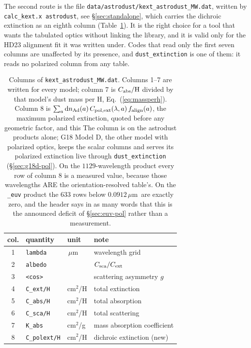 \documentclass{my_memo}
\newcommand{\code}[1]{\texttt{#1}}
\newcommand{\um}{\ensuremath{\,\mu\mathrm{m}}}
\begin{document}
The second route is the file \code{data/astrodust/kext\_astrodust\_MW.dat}, written by
\code{calc\_kext.x astrodust}, see \S\ref{sec:standalone}, which carries the
dichroic extinction as an eighth column (Table~\ref{tab:kextcols}). It is the
right choice for a tool that wants the tabulated optics without linking the
library, and it is valid only for the HD23 alignment fit it was written under.
Codes that read only the first seven columns are unaffected by its presence, and
\code{dust\_extinction} is one of them: it reads no polarized column from any
table.

\begin{table}[h]
\centering
\begin{tabular}{@{}clll@{}}
\toprule
col. & quantity & unit & note \\
\midrule
1 & \code{lambda}        & \um\        & wavelength grid \\
2 & \code{albedo}        &             & $C_{\rm sca}/C_{\rm ext}$ \\
3 & \code{<cos>}         &             & scattering asymmetry $g$ \\
4 & \code{C\_ext/H}      & cm$^2$/H    & total extinction \\
5 & \code{C\_abs/H}      & cm$^2$/H    & total absorption \\
6 & \code{C\_sca/H}      & cm$^2$/H    & total scattering \\
7 & \code{K\_abs}        & cm$^2$/g    & mass absorption coefficient \\
8 & \code{C\_polext/H}   & cm$^2$/H    & dichroic extinction (new) \\
\bottomrule
\end{tabular}
\caption{Columns of \code{kext\_astrodust\_MW.dat}. Columns 1--7 are written for
every model; column 7 is $C_{\rm abs}/{\rm H}$ divided by that model's dust mass
per H, Eq.~(\ref{eq:massperh}). Column 8 is
$\sum_a {\rm d}n_{\rm Ad}(a)\,C_{\rm pol,ext}(\lambda,a)\,f_{\rm align}(a)$,
the maximum polarized extinction, quoted before any geometric factor, and this
The column is on the astrodust products alone; G18 Model D, the other model
with polarized optics, keeps the scalar columns and serves its polarized
extinction live through \code{dust\_extinction} (\S\ref{sec:g18d-pol}). On the $1129$-wavelength product every row of column 8
is a measured value, because those wavelengths ARE the orientation-resolved
table's. On the \code{\_euv} product the $633$ rows below $0.0912$\um\ are
exactly zero, and the header says in as many words that this is the announced
deficit of \S\ref{sec:euv-pol} rather than a measurement.}
\label{tab:kextcols}
\end{table}
\end{document}
